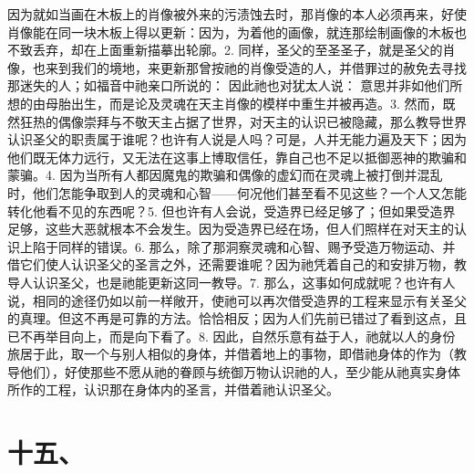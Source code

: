 因为就如当画在木板上的肖像被外来的污渍蚀去时，那肖像的本人必须再来，好使肖像能在同一块木板上得以更新：因为，为着他的画像，就连那绘制画像的木板也不致丢弃，却在上面重新描摹出轮廓。2. 同样，圣父的至圣圣子，就是圣父的肖像，也来到我们的境地，来更新那曾按祂的肖像受造的人，并借罪过的赦免去寻找那迷失的人；如福音中祂亲口所说的： 因此祂也对犹太人说： 意思并非如他们所想的由母胎出生，而是论及灵魂在天主肖像的模样中重生并被再造。3. 然而，既然狂热的偶像崇拜与不敬天主占据了世界，对天主的认识已被隐藏，那么教导世界认识圣父的职责属于谁呢？也许有人说是人吗？可是，人并无能力遍及天下；因为他们既无体力远行，又无法在这事上博取信任，靠自己也不足以抵御恶神的欺骗和蒙骗。4. 因为当所有人都因魔鬼的欺骗和偶像的虚幻而在灵魂上被打倒并混乱时，他们怎能争取到人的灵魂和心智——何况他们甚至看不见这些？一个人又怎能转化他看不见的东西呢？5. 但也许有人会说，受造界已经足够了；但如果受造界足够，这些大恶就根本不会发生。因为受造界已经在场，但人们照样在对天主的认识上陷于同样的错误。6. 那么，除了那洞察灵魂和心智、赐予受造万物运动、并借它们使人认识圣父的圣言之外，还需要谁呢？因为祂凭着自己的和安排万物，教导人认识圣父，也是祂能更新这同一教导。7. 那么，这事如何成就呢？也许有人说，相同的途径仍如以前一样敞开，使祂可以再次借受造界的工程来显示有关圣父的真理。但这不再是可靠的方法。恰恰相反；因为人们先前已错过了看到这点，且已不再举目向上，而是向下看了。8. 因此，自然乐意有益于人，祂就以人的身份旅居于此，取一个与别人相似的身体，并借着地上的事物，即借祂身体的作为（教导他们），好使那些不愿从祂的眷顾与统御万物认识祂的人，至少能从祂真实身体所作的工程，认识那在身体内的圣言，并借着祂认识圣父。\par


\section{十五、}

